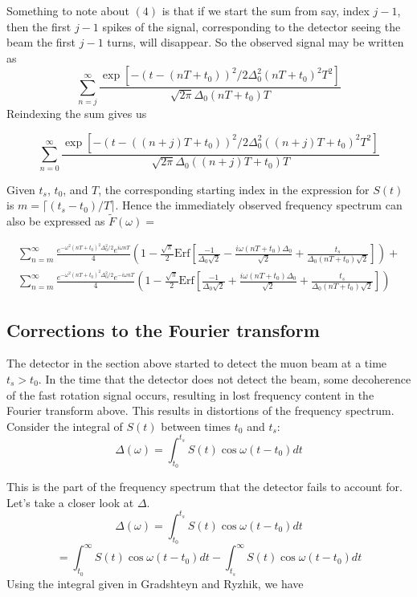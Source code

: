 \documentclass{article}
\begin{document}
Something to note about $(4)$ is that if we start the sum from say, index $j-1$, then the first $j-1$ spikes of the signal, corresponding to the detector seeing the beam the first $j-1$ turns, will disappear. So the observed signal may be written as \[\sum^{\infty}_{n=j}\frac{\exp[-(t-(nT+t_0))^2/2\Delta^2_0(nT+t_0)^2T^2]}{\sqrt{2\pi}\Delta_0(nT+t_0)T}\] Reindexing the sum gives us 

\begin{equation}
\sum^{\infty}_{n=0}\frac{\exp[-(t-((n+j)T+t_0))^2/2\Delta^2_0((n+j)T+t_0)^2T^2]}{\sqrt{2\pi}\Delta_0((n+j)T+t_0)T}
\end{equation}

Given $t_s$, $t_0$, and $T$, the corresponding starting index in the expression for $S(t)$ is $m=\lceil{(t_s-t_0)/T}\rceil$. Hence the immediately observed frequency spectrum can also be expressed as $\tilde{F}(\omega)=$ 

\begin{gather}
\sum^{\infty}_{n=m}\frac{e^{-\omega^2(nT+t_0)^2\Delta^2_0/2}e^{i\omega nT}}{4}\left(1-\frac{\sqrt{\pi}}{2}\text{Erf}\left[\frac{-1}{\Delta_0\sqrt{2}}-\frac{i\omega (nT+t_0)\Delta_0}{\sqrt{2}}+\frac{t_s}{\Delta_0(nT+t_0)\sqrt{2}}\right]\right)+ \nonumber \\
\sum^{\infty}_{n=m}\frac{e^{-\omega^2(nT+t_0)^2\Delta^2_0/2}e^{-i\omega nT}}{4}\left(1-\frac{\sqrt{\pi}}{2}\text{Erf}\left[\frac{-1}{\Delta_0\sqrt{2}}+\frac{i\omega (nT+t_0)\Delta_0}{\sqrt{2}}+\frac{t_s}{\Delta_0(nT+t_0)\sqrt{2}}\right]\right)
\end{gather}

\subsection{Corrections to the Fourier transform} The detector in the section above started to detect the muon beam at a time $t_s>t_0$. In the time that the detector does not detect the beam, some decoherence of the fast rotation signal occurs, resulting in lost frequency content in the Fourier transform above. This results in distortions of the frequency spectrum.  Consider the integral of $S(t)$ between times $t_0$ and $t_s$: 
\begin{equation}
\Delta(\omega)=\int^{t_s}_{t_0}S(t)\cos\omega(t-t_0)dt
\end{equation}

This is the part of the frequency spectrum that the detector fails to account for. Let's take a closer look at $\Delta$. \[\Delta(\omega)=\int^{t_s}_{t_0}S(t)\cos\omega(t-t_0)dt\]\[=\int^{\infty}_{t_0}S(t)\cos\omega(t-t_0)dt-\int^{\infty}_{t_s}S(t)\cos\omega(t-t_0)dt\] Using the integral given in Gradshteyn and Ryzhik, we have 
\end{document}
